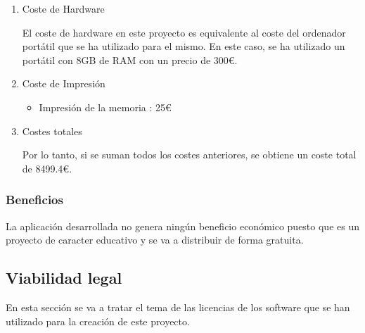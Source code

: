 \begin{enumerate}
\item Coste de Hardware

El coste de hardware en este proyecto es equivalente al coste del ordenador portátil que se ha utilizado para el mismo. En este caso, se ha utilizado un portátil con 8GB de RAM con un precio de 300€.

\item Coste de Impresión
\begin{itemize}
\item Impresión de la memoria : 25€
\end{itemize}

\item Costes totales

Por lo tanto, si se suman todos los costes anteriores, se obtiene un coste total de 8499.4€.
\end{enumerate}

\subsubsection{Beneficios}
La aplicación desarrollada no genera ningún beneficio económico puesto que es un proyecto de caracter educativo y se va a distribuir de forma gratuita. 

\subsection{Viabilidad legal}

En esta sección se va a tratar el tema de las licencias de los software que se han utilizado para la creación de este proyecto. 

